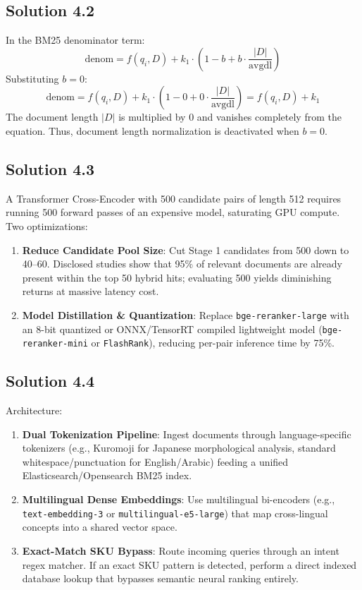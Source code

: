 \subsection*{Solution 4.2}
In the BM25 denominator term:
\[
\text{denom} = f(q_i, D) + k_1 \cdot \left(1 - b + b \cdot \frac{|D|}{\text{avgdl}}\right)
\]
Substituting $b = 0$:
\[
\text{denom} = f(q_i, D) + k_1 \cdot \left(1 - 0 + 0 \cdot \frac{|D|}{\text{avgdl}}\right) = f(q_i, D) + k_1
\]
The document length $|D|$ is multiplied by 0 and vanishes completely from the equation. Thus, document length normalization is deactivated when $b=0$.

\subsection*{Solution 4.3}
A Transformer Cross-Encoder with 500 candidate pairs of length 512 requires running 500 forward passes of an expensive model, saturating GPU compute.
Two optimizations:
\begin{enumerate}
  \item \textbf{Reduce Candidate Pool Size}: Cut Stage 1 candidates from 500 down to 40--60. Disclosed studies show that 95\% of relevant documents are already present within the top 50 hybrid hits; evaluating 500 yields diminishing returns at massive latency cost.
  \item \textbf{Model Distillation \& Quantization}: Replace \texttt{bge-reranker-large} with an 8-bit quantized or ONNX/TensorRT compiled lightweight model (\texttt{bge-reranker-mini} or \texttt{FlashRank}), reducing per-pair inference time by 75\%.
\end{enumerate}

\subsection*{Solution 4.4}
Architecture:
\begin{enumerate}
  \item \textbf{Dual Tokenization Pipeline}: Ingest documents through language-specific tokenizers (e.g., Kuromoji for Japanese morphological analysis, standard whitespace/punctuation for English/Arabic) feeding a unified Elasticsearch/Opensearch BM25 index.
  \item \textbf{Multilingual Dense Embeddings}: Use multilingual bi-encoders (e.g., \texttt{text-embedding-3} or \texttt{multilingual-e5-large}) that map cross-lingual concepts into a shared vector space.
  \item \textbf{Exact-Match SKU Bypass}: Route incoming queries through an intent regex matcher. If an exact SKU pattern is detected, perform a direct indexed database lookup that bypasses semantic neural ranking entirely.
\end{enumerate}


